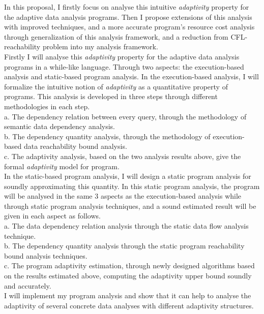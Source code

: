 \begin{abstractpage}
   In this proposal, I firstly focus on analyse this intuitive \emph{adaptivity} property for the adaptive data analysis programs. 
   Then I propose extensions of this analysis with improved techniques, 
   and a more accurate program's resource cost analysis through
   generalization of this analysis framework, and a reduction from CFL-reachability problem into my analysis framework.
   \\
   Firstly I will analyse this \emph{adaptivity} property for the adaptive data analysis programs in a while-like language.
   Through two aspects: the execution-based analysis and static-based program analysis.
	In the execution-based analysis, I will formalize the intuitive notion of \emph{adaptivity} as a quantitative 
   property of programs. This analysis is developed in three steps through different methodologies in each step. 
   \\
	a. The dependency relation between every query, through the methodology of semantic data dependency analysis.
   \\
	b. The dependency quantity analysis, through the methodology of execution-based data reachability bound analysis.
   \\
	c. The adaptivity analysis, based on the two analysis results above, give the formal \emph{adaptivity} model 
   for program.
   \\   
	In the static-based program analysis, I will design a static program analysis for soundly approximating this quantity.
   In this static program analysis, the program will be analysed in the same 3 aspects as the execution-based analysis 
   while through static program analysis techniques, and a sound estimated result will be given in each aspect as follows.
   \\
	a. The data dependency relation analysis through the static data flow analysis technique.
   \\
	b. The dependency quantity analysis through the static program reachability bound analysis techniques.
   \\
	c. The program adaptivity estimation, through newly designed algorithms based on the results estimated above, 
   computing the adaptivity upper bound soundly 
   and accurately.
   \\
   I will implement my program analysis and show that it can help to analyse the adaptivity of several concrete data analyses with different adaptivity structures.


\end{abstractpage}
